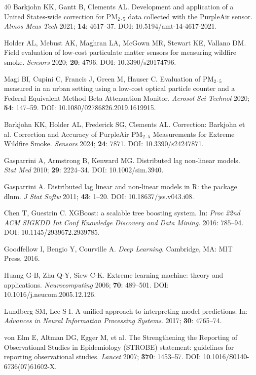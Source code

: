 \documentclass[review,number]{elsarticle}
\begin{document}
\begin{thebibliography}{40}
Barkjohn KK, Gantt B, Clements AL.
Development and application of a United States-wide correction for $\text{PM}_{2{\cdot}5}$ data collected with the PurpleAir sensor.
\textit{Atmos Meas Tech} 2021; \textbf{14}: 4617--37.
DOI: 10.5194/amt-14-4617-2021.

Holder AL, Mebust AK, Maghran LA, McGown MR, Stewart KE, Vallano DM.
Field evaluation of low-cost particulate matter sensors for measuring wildfire smoke.
\textit{Sensors} 2020; \textbf{20}: 4796.
DOI: 10.3390/s20174796.

Magi BI, Cupini C, Francis J, Green M, Hauser C.
Evaluation of $\text{PM}_{2{\cdot}5}$ measured in an urban setting using a low-cost optical particle counter and a Federal Equivalent Method Beta Attenuation Monitor.
\textit{Aerosol Sci Technol} 2020; \textbf{54}: 147--59.
DOI: 10.1080/02786826.2019.1619915.

Barkjohn KK, Holder AL, Frederick SG, Clements AL.
Correction: Barkjohn et al. Correction and Accuracy of PurpleAir $\text{PM}_{2{\cdot}5}$ Measurements for Extreme Wildfire Smoke.
\textit{Sensors} 2024; \textbf{24}: 7871.
DOI: 10.3390/s24247871.

Gasparrini A, Armstrong B, Kenward MG.
Distributed lag non-linear models.
\textit{Stat Med} 2010; \textbf{29}: 2224--34.
DOI: 10.1002/sim.3940.

Gasparrini A.
Distributed lag linear and non-linear models in R: the package dlnm.
\textit{J Stat Softw} 2011; \textbf{43}: 1--20.
DOI: 10.18637/jss.v043.i08.

Chen T, Guestrin C.
XGBoost: a scalable tree boosting system.
In: \textit{Proc 22nd ACM SIGKDD Int Conf Knowledge Discovery and Data Mining}. 2016: 785--94.
DOI: 10.1145/2939672.2939785.

Goodfellow I, Bengio Y, Courville A.
\textit{Deep Learning}.
Cambridge, MA: MIT Press, 2016.

Huang G-B, Zhu Q-Y, Siew C-K.
Extreme learning machine: theory and applications.
\textit{Neurocomputing} 2006; \textbf{70}: 489--501.
DOI: 10.1016/j.neucom.2005.12.126.

Lundberg SM, Lee S-I.
A unified approach to interpreting model predictions.
In: \textit{Advances in Neural Information Processing Systems}. 2017; \textbf{30}: 4765--74.

von Elm E, Altman DG, Egger M, et al.
The Strengthening the Reporting of Observational Studies in Epidemiology (STROBE) statement: guidelines for reporting observational studies.
\textit{Lancet} 2007; \textbf{370}: 1453--57.
DOI: 10.1016/S0140-6736(07)61602-X.


\end{thebibliography}
\end{document}
